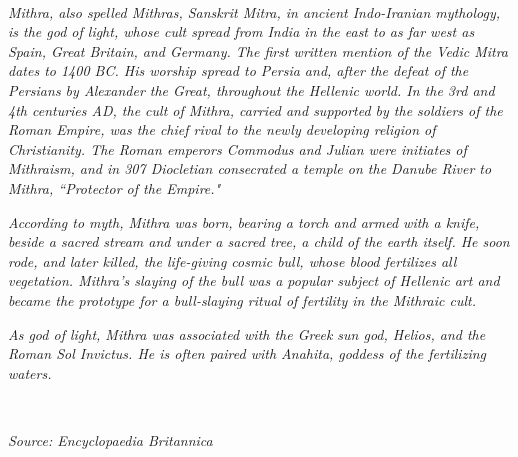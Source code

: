 \documentclass{report}
\begin{document}
\newpage

\

\vspace{8cm}

{\large \noindent \textit{Mithra, also spelled Mithras, Sanskrit Mitra, in ancient Indo-Iranian mythology, is the god of light, whose cult spread from India in the east to as far west as Spain, Great Britain, and Germany. The first written mention of the Vedic Mitra dates to 1400 BC. His worship spread to Persia and, after the defeat of the Persians by Alexander the Great, throughout the Hellenic world. In the 3rd and 4th centuries AD, the cult of Mithra, carried and supported by the soldiers of the Roman Empire, was the chief rival to the newly developing religion of Christianity. The Roman emperors Commodus and Julian were initiates of Mithraism, and in 307 Diocletian consecrated a temple on the Danube River to Mithra, ``Protector of the Empire."}

\noindent \textit{According to myth, Mithra was born, bearing a torch and armed with a knife, beside a sacred stream and under a sacred tree, a child of the earth itself. He soon rode, and later killed, the life-giving cosmic bull, whose blood fertilizes all vegetation. Mithra's slaying of the bull was a popular subject of Hellenic art and became the prototype for a bull-slaying ritual of fertility in the Mithraic cult.}

\noindent \textit{As god of light, Mithra was associated with the Greek sun god, Helios, and the Roman Sol Invictus. He is often paired with Anahita, goddess of the fertilizing waters.}

\

\hspace{10cm} \textit{Source: Encyclopaedia Britannica}}

\newpage
\tableofcontents
\listoftables
\listoffigures







% 





\printindex



\end{document}
